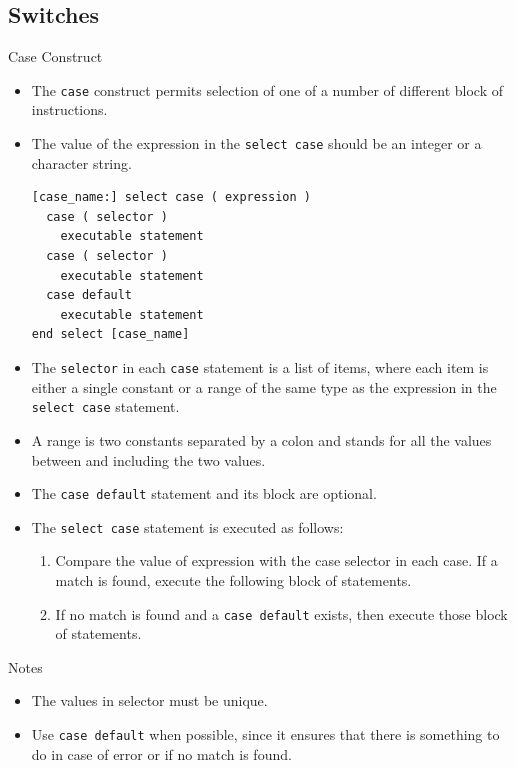 \documentclass[c,mathserif,compress,xcolor=svgnames]{beamer}
\newcommand{\lstfortran}[1]{\lstinline[language={[90]Fortran},basicstyle=\footnotesize\ttfamily]|#1|}
\newenvironment{ablock}[0]
{
\begin{beamerboxesrounded}[upper=uppercol,lower=lowercol,shadow=true]}
{\end{beamerboxesrounded}}
\begin{document}
\subsection{Switches}
\begin{frame}{Case Construct}
  \begin{itemize}
    \item The \lstfortran{case} construct permits selection of one of a number of different block of instructions.
    \item The value of the expression in the \lstfortran{select case} should be an integer or a character string.
      \begin{lstlisting}[language={[90]Fortran},basicstyle=\fontsize{6}{7}\selectfont\ttfamily]
[case_name:] select case ( expression )
  case ( selector )
    executable statement
  case ( selector )
    executable statement
  case default
    executable statement
end select [case_name]
      \end{lstlisting}
    \item The \lstfortran{selector} in each \lstfortran{case} statement is a list of items, where each item is either a single constant or a range of the same type as the expression in the \lstfortran{select case} statement.
    \item A range is two constants separated by a colon and stands for all the values between and including the two values. 
    \item The \lstfortran{case default} statement and its block are optional.
    \item The \lstfortran{select case} statement is executed as follows:
    \begin{enumerate}
      \item Compare the value of expression with the case selector in each case. If a match is found, execute the following block of statements.
      \item If no match is found and a \lstfortran{case default} exists, then execute those block of statements.
    \end{enumerate}
  \end{itemize}
  \begin{ablock}{Notes}
    \begin{itemize}
      \item The values in selector must be unique.
      \item Use \lstfortran{case default} when possible, since it ensures that there is something to do in case of error or if no match is found.

\end{itemize}
\end{ablock}
\end{frame}
\end{document}
